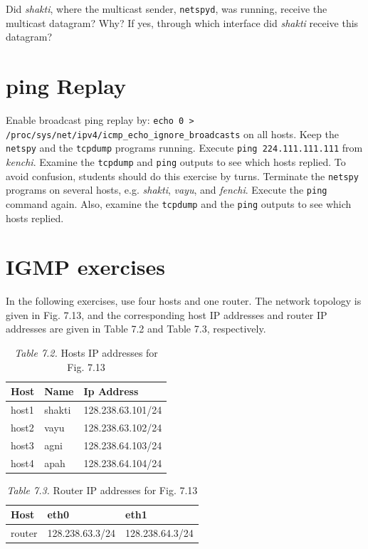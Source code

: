 \documentclass{../UTNetLab}
\begin{document}
    Did \textit{shakti}, where the multicast sender, \lstinline{netspyd}, was running, receive the multicast datagram?
    Why?
    If yes, through which interface did \textit{shakti} receive this datagram?

\section{ping Replay}
    Enable broadcast ping replay by: \lstinline{echo 0 > /proc/sys/net/ipv4/icmp_echo_ignore_broadcasts} on all hosts.
    Keep the \lstinline{netspy} and the \lstinline{tcpdump} programs running.
    Execute \lstinline{ping 224.111.111.111} from \textit{kenchi}.
    Examine the \lstinline{tcpdump} and \lstinline{ping} outputs to see which hosts replied.
    To avoid confusion, students should do this exercise by turns.
    Terminate the \lstinline{netspy} programs on several hosts, e.g. \textit{shakti}, \textit{vayu}, and \textit{fenchi}.
    Execute the \lstinline{ping} command again.
    Also, examine the \lstinline{tcpdump} and the \lstinline{ping} outputs to see which hosts replied.

\section*{IGMP exercises}
    In the following exercises, use four hosts and one router. The network topology is given in Fig. 7.13, and the corresponding host IP addresses and router IP addresses are given in Table 7.2 and Table 7.3, respectively.

    \begin{table}[H]
        \caption{\textit{Table 7.2.} Hosts IP addresses for Fig. 7.13}
        \label{tbl:7.2}
        \centering
        \begin{tabular}{ *3l }
            \hline \hline
            Host & Name & Ip Address \\
            \hline
                host1 & shakti & 128.238.63.101/24 \\
                host2 & vayu   & 128.238.63.102/24 \\
                host3 & agni   & 128.238.64.103/24 \\
                host4 & apah   & 128.238.64.104/24 \\
            \hline \hline
            \end{tabular}
    \end{table}

    \begin{table}[H]
        \caption{\textit{Table 7.3.} Router IP addresses for Fig. 7.13}
        \label{tbl:7.3}
        \centering
        \begin{tabular}{ *3l }
            \hline \hline
            Host & eth0 & eth1 \\
            \hline
            router & 128.238.63.3/24 & 128.238.64.3/24 \\
            \hline \hline
            \end{tabular}
    \end{table}
\end{document}
